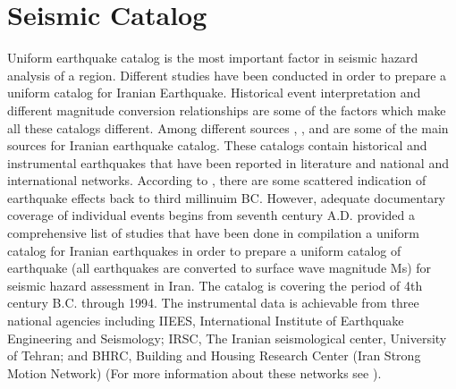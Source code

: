 
\section{Seismic Catalog}

Uniform earthquake catalog is the most important factor in seismic hazard analysis of a region.  Different studies have been conducted in order to prepare a uniform catalog for Iranian Earthquake. Historical event interpretation and different magnitude conversion relationships are some of the factors which make all these catalogs different. Among different sources \citet{Ambraseys2005}, \citet{Berberian1994}, and \citet{moinfar1994} are some of the main sources for Iranian earthquake catalog. These catalogs contain historical and instrumental earthquakes that have been reported in literature and national and international networks. According to \citet{Ambraseys2005}, there are some scattered indication of earthquake effects  back to third millinuim BC. However, adequate documentary coverage of individual events begins from seventh century A.D. \citet{Mirzaei1997} provided a comprehensive list of studies that have been done in compilation a uniform catalog for Iranian earthquakes in order to prepare a uniform catalog of earthquake (all earthquakes are converted to surface wave magnitude Ms) for seismic hazard assessment in Iran. The catalog is covering the period of 4th century B.C. through 1994. The instrumental data is achievable from three national agencies including IIEES, International Institute of Earthquake Engineering and Seismology; IRSC, The Iranian seismological center, University of Tehran; and BHRC, Building and Housing Research Center (Iran Strong Motion Network) (For more information about these networks see \citet{Karimiparidari2013}).




